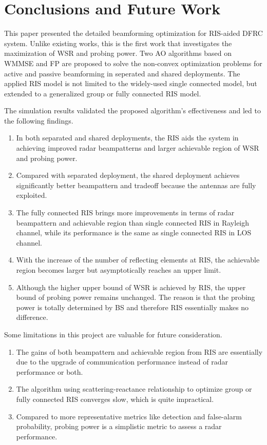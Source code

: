 \chapter{Conclusions and Future Work}\label{cha:conclusion}

This paper presented the detailed beamforming optimization for RIS-aided DFRC system. Unlike existing works, 
this is the first work that investigates the maximization of WSR and probing power. Two AO algorithms
based on WMMSE and FP are proposed to solve the non-convex optimization problems for active and passive beamforming in seperated and shared deployments.
The applied RIS model is not limited to the widely-used single connected model, but extended to a generalized group or fully connected RIS model.

The simulation results validated the proposed algorithm's effectiveness and led to the following findings.
\begin{enumerate}
    \item In both separated and shared deployments, the RIS aids the system in achieving improved radar beampatterns and larger achievable region of WSR and probing power.
    \item Compared with separated deployment, the shared deployment achieves significantly better beampattern and tradeoff because the antennas are fully exploited.
    \item The fully connected RIS brings more improvements in terms of radar beampattern and achievable region than single connected RIS in Rayleigh channel, while its performance is the same as single connected RIS in LOS channel.
    \item With the increase of the number of reflecting elements at RIS, the achievable region becomes larger but asymptotically reaches an upper limit.
    \item Although the higher upper bound of WSR is achieved by RIS, the upper bound of probing power remains unchanged. The reason is that the probing power is totally determined by BS and therefore RIS essentially makes no difference.
\end{enumerate}
Some limitations in this project are valuable for future consideration.
\begin{enumerate}
    \item The gains of both beampattern and achievable region from RIS are essentially due to the upgrade of communication performance instead of radar performance or both.
    \item The algorithm using scattering-reactance relationship to optimize group or fully connected RIS converges slow, which is quite impractical.
    \item Compared to more representative metrics like detection and false-alarm probability, probing power is a simplistic metric to assess a radar performance.
\end{enumerate}
